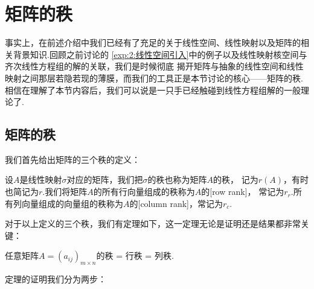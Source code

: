 \chapter{矩阵的秩}

事实上，在前述介绍中我们已经有了充足的关于线性空间、线性映射以及矩阵的相关背景知识.回顾之前讨论的
\autoref{exp:2:线性空间引入}中的例子以及线性映射核空间与齐次线性方程组的解的关联，我们是时候彻底
揭开矩阵与抽象的线性空间和线性映射之间那层若隐若现的薄膜，而我们的工具正是本节讨论的核心——矩阵的秩.
相信在理解了本节内容后，我们可以说是一只手已经触碰到线性方程组解的一般理论了.

\section{矩阵的秩}
我们首先给出矩阵的三个秩的定义：
\begin{definition}
    设$A$是线性映射$\sigma$对应的矩阵，我们把$\sigma$的秩也称为矩阵$A$的秩，
    记为$r(A)$，有时也简记为$r$.我们将矩阵$A$的所有行向量组成的秩称为$A$的[row rank]，
    常记为$r_r$.所有列向量组成的向量组的秩称为$A$的[column rank]，常记为$r_c$.
\end{definition}
对于以上定义的三个秩，我们有定理如下，这一定理无论是证明还是结果都非常关键：
\begin{theorem}
    任意矩阵$A=(a_{ij})_{m\times n}$的秩 = 行秩 = 列秩.
\end{theorem}
定理的证明我们分为两步：
